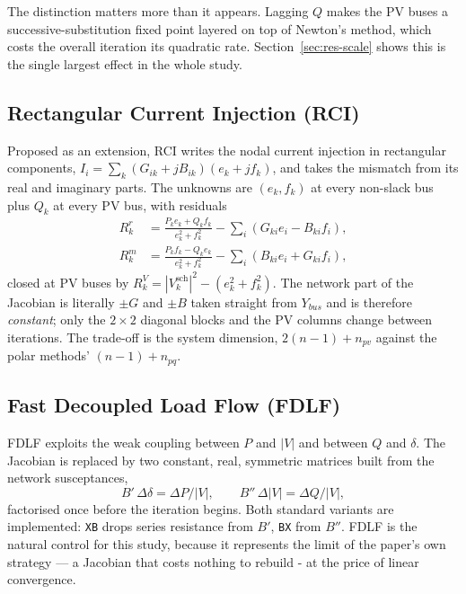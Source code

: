 \documentclass[sigconf,nonacm]{acmart}
\begin{document}
The distinction matters more than it appears. Lagging $Q$ makes the PV buses a
successive-substitution fixed point layered on top of Newton's method, which
costs the overall iteration its quadratic rate. Section~\ref{sec:res-scale}
shows this is the single largest effect in the whole study.

\subsection{Rectangular Current Injection (RCI)}
Proposed as an extension, RCI writes the nodal current injection in rectangular
components, $I_i = \sum_k (G_{ik}+jB_{ik})(e_k+jf_k)$, and takes the mismatch
from its real and imaginary parts. The unknowns are $(e_k,f_k)$ at every
non-slack bus plus $Q_k$ at every PV bus, with residuals
\begin{align}
R^{r}_{k} &= \frac{P_k e_k + Q_k f_k}{e_k^{2}+f_k^{2}}
             - \sum_i \left(G_{ki}e_i - B_{ki}f_i\right), \\
R^{m}_{k} &= \frac{P_k f_k - Q_k e_k}{e_k^{2}+f_k^{2}}
             - \sum_i \left(B_{ki}e_i + G_{ki}f_i\right),
\end{align}
closed at PV buses by
$R^{V}_{k} = |V^{\mathrm{sch}}_k|^{2} - (e_k^{2}+f_k^{2})$. The network part of
the Jacobian is literally $\pm G$ and $\pm B$ taken straight from $Y_{bus}$ and
is therefore \emph{constant}; only the $2\times2$ diagonal blocks and the PV
columns change between iterations. The trade-off is the system dimension,
$2(n-1)+n_{pv}$ against the polar methods' $(n-1)+n_{pq}$.

\subsection{Fast Decoupled Load Flow (FDLF)}
FDLF exploits the weak coupling between $P$ and $|V|$ and between $Q$ and
$\delta$. The Jacobian is replaced by two constant, real, symmetric matrices
built from the network susceptances,
\begin{equation}
B'\,\Delta\delta = \Delta P/|V| , \qquad
B''\,\Delta|V| = \Delta Q/|V| ,
\end{equation}
factorised once before the iteration begins. Both standard variants are
implemented: \texttt{XB} drops series resistance from $B'$, \texttt{BX} from
$B''$. FDLF is the natural control for this study, because it represents the
limit of the paper's own strategy --- a Jacobian that costs nothing to rebuild
- at the price of linear convergence.
\end{document}

